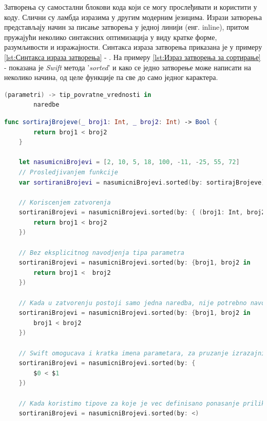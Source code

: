 \documentclass[12pt,oneside]{memoir}
\begin{document}
\indent Затворења су самостални блокови кода који се могу прослеђивати и користити у коду. Слични су ламбда изразима у другим модерним језицима. Изрази затворења представљају начин за писање затворења у једној линији (енг. inline), притом пружајући неколико синтаксних оптимизација у виду кратке форме, разумљивости и изражајности. Синтакса израза затворења приказана је у примеру \ref{lst:Синтакса израза затворења} - . На примеру \ref{lst:Израз затворења за сортирање} -  показана је \textit{Swift} метода '\textit{sorted}' и како се једно затворење може написати на неколико начина, од целе функције па све до само једног карактера.

\begin{lstlisting}[caption=\textit{{Синтакса израза затворења}}, label={lst:Синтакса израза затворења}, language=Swift, frame=single]
    (parametri) -> tip_povratne_vrednosti in
        naredbe
\end{lstlisting}

\begin{lstlisting}[caption=\textit{{Израз затворења за сортирање}}, label={lst:Израз затворења за сортирање}, language=Swift, frame=single]
    func sortirajBrojeve(_ broj1: Int, _ broj2: Int) -> Bool {
        return broj1 < broj2
    }
    
    let nasumicniBrojevi = [2, 10, 5, 18, 100, -11, -25, 55, 72]
    // Prosledjivanjem funkcije
    var sortiraniBrojevi = nasumicniBrojevi.sorted(by: sortirajBrojeve)
    
    // Koriscenjem zatvorenja
    sortiraniBrojevi = nasumicniBrojevi.sorted(by: { (broj1: Int, broj2: Int) -> Bool in
        return broj1 < broj2
    })
    
    // Bez eksplicitnog navodjenja tipa parametra
    sortiraniBrojevi = nasumicniBrojevi.sorted(by: {broj1, broj2 in 
        return broj1 <  broj2
    })
    
    // Kada u zatvorenju postoji samo jedna naredba, nije potrebno navodjenje kljucne reci 'return', povratna vrednost bice vrednost izvrsenja te naredbe
    sortiraniBrojevi = nasumicniBrojevi.sorted(by: {broj1, broj2 in 
        broj1 < broj2
    })
    
    // Swift omogucava i kratka imena parametara, za pruzanje izrazajnije sintakse
    sortiraniBrojevi = nasumicniBrojevi.sorted(by: { 
        $0 < $1
    })
    
    // Kada koristimo tipove za koje je vec definisano ponasanje prilikom poredjenja, mozemo proslediti samo kako zelimo da sortiramo clanove niza
    sortiraniBrojevi = nasumicniBrojevi.sorted(by: <)
\end{lstlisting}
\end{document}
